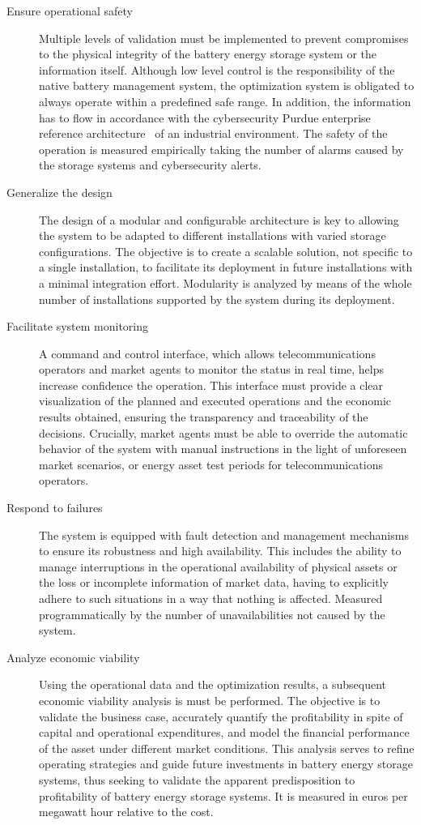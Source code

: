 \begin{description}
  \item[Ensure operational safety] Multiple levels of validation must be implemented to prevent compromises to the physical integrity of the battery energy storage system or the information itself. Although low level control is the responsibility of the native battery management system, the optimization system is obligated to always operate within a predefined safe range. In addition, the information has to flow in accordance with the cybersecurity Purdue enterprise reference architecture~\cite{williams1994purdue} of an industrial environment. The safety of the operation is measured empirically taking the number of alarms caused by the storage systems and cybersecurity alerts.

  \item[Generalize the design] The design of a modular and configurable architecture is key to allowing the system to be adapted to different installations with varied storage configurations. The objective is to create a scalable solution, not specific to a single installation, to facilitate its deployment in future installations with a minimal integration effort. Modularity is analyzed by means of the whole number of installations supported by the system during its deployment.

  \item[Facilitate system monitoring] A command and control interface, which allows telecommunications operators and market agents to monitor the status in real time, helps increase confidence the operation. This interface must provide a clear visualization of the planned and executed operations and the economic results obtained, ensuring the transparency and traceability of the decisions. Crucially, market agents must be able to override the automatic behavior of the system with manual instructions in the light of unforeseen market scenarios, or energy asset test periods for telecommunications operators.

  \item[Respond to failures] The system is equipped with fault detection and management mechanisms to ensure its robustness and high availability. This includes the ability to manage interruptions in the operational availability of physical assets or the loss or incomplete information of market data, having to explicitly adhere to such situations in a way that nothing is affected. Measured programmatically by the number of unavailabilities not caused by the system.

  \item[Analyze economic viability] Using the operational data and the optimization results, a subsequent economic viability analysis is must be performed. The objective is to validate the business case, accurately quantify the profitability in spite of capital and operational expenditures, and model the financial performance of the asset under different market conditions. This analysis serves to refine operating strategies and guide future investments in battery energy storage systems, thus seeking to validate the apparent predisposition to profitability of battery energy storage systems. It is measured in euros per megawatt hour relative to the cost.


\end{description}
